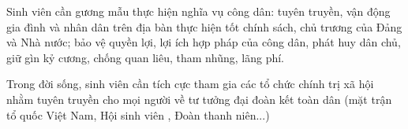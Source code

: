 Sinh viên cần gương mẫu thực hiện nghĩa vụ công dân: tuyên truyền, vận động gia đình và nhân dân trên địa bàn thực hiện tốt chính sách, chủ trương của Đảng và Nhà nước; bảo vệ quyền lợi, lợi ích hợp pháp của công dân, phát huy dân chủ, giữ gìn kỷ cương, chống quan liêu, tham nhũng, lãng phí.

Trong đời sống, sinh viên cần tích cực tham gia các tổ chức chính trị xã hội nhằm tuyên truyền cho mọi người về tư tưởng đại đoàn kết toàn dân (mặt trận tổ quốc Việt Nam, Hội sinh viên , Đoàn thanh niên...)
